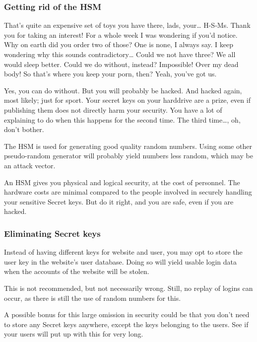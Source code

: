 \subsubsection{Getting rid of the HSM}
\begin{dialogue}
		
				That's quite an expensive set of toys you have there, lads, your\ldots
				H-S-Ms.
	Thank you for taking an interest!
				For a whole week I was wondering if you'd notice.
		Why on earth did you order two of those?
	One is none, I always say.
				I keep wondering why this sounds contradictory\ldots
{}		Could we not have three? We all would sleep better.
		Could we do without, instead?
	
				Impossible!
		
				Over my dead body!
		
				So that's where you keep your porn, then?
		
				Yeah, you've got us.
\end{dialogue}
Yes, you can do without.
But you will probably be hacked.
And hacked again,
most likely;
just for sport.
Your secret keys on your harddrive are a prize,
even if publishing them does not directly harm your security.
You have a lot of explaining to do when this happens for the second time.
The third time\ldots, oh, don't bother.
\par
The HSM is used for generating good quality random numbers.
Using some other pseudo-random generator will probably yield numbers less random,
which may be an attack vector.
\par
An HSM gives you physical and logical security,
at the cost of personnel.
The hardware costs are minimal compared to the people involved in securely handling your sensitive Secret keys.
But do it right,
and you are safe,
even if you are hacked.
\subsubsection{Eliminating Secret keys}
Instead of having different keys for website and user,
you may opt to store the user key in the website's user database.
Doing so will yield usable login data when the accounts of the website will be stolen.
\par
This is not recommended,
but not necessarily wrong.
Still,
no replay of logins can occur,
as there is still the use of random numbers for this.
\par
A possible bonus for this large omission in security could be that you don't need to store any Secret keys anywhere,
except the keys belonging to the users.
See if your users will put up with this for very long.
